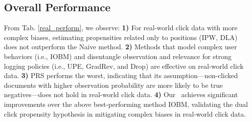 \subsection{Overall Performance}
From Tab. \ref{real_perform}, we observe: \textbf{1)} For real-world click data with more complex biases, estimating propensities related only to positions (IPW, DLA) does not outperform the Naive method. 
\textbf{2)} Methods that model complex user behaviors (i.e., IOBM) and disentangle observation and relevance for strong logging policies (i.e., UPE, GradRev, and Drop) are effective on real-world click data.  
\textbf{3)} PRS performs the worst, indicating that its assumption---non-clicked documents with higher observation probability are more likely to be true negatives---does not hold in real-world click data. 
\textbf{4)} Our \m~achieves significant improvements over the above best-performing method IOBM, validating the dual click propensity hypothesis in mitigating complex biases in real-world click data. 
